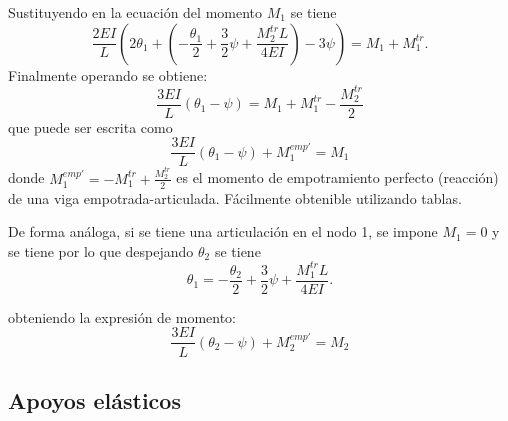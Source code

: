 Sustituyendo en la ecuación del momento $M_1$ se tiene
%
\begin{equation}
\frac{2 EI}{L} \left( 2 \theta_1 + \left( -\frac{\theta_1}{2} + \frac{3}{2} \psi + \frac{M_2^{tr} L }{4 EI} \right) - 3 \psi  \right) = M_1 + M_1^{tr}.
\end{equation}
%
Finalmente operando se obtiene:
%
\begin{equation} \label{eqn:ecmomart}
\frac{3 EI}{L} \left( \theta_1 - \psi  \right) = M_1 + M_1^{tr} - \frac{ M_2^{tr}}{2}
\end{equation}
%
que puede ser escrita como
%
\begin{equation}
\boxed{
\frac{3 EI}{L} \left( \theta_1 - \psi  \right) + M_1^{emp'} = M_1
}
\end{equation}
%
donde $M_1^{emp'} = - M_1^{tr} + \frac{ M_2^{tr}}{2} $ es el momento de empotramiento perfecto (reacción) de una viga empotrada-articulada. %
%
Fácilmente obtenible utilizando tablas.


De forma análoga, si se tiene una articulación en el nodo 1, se impone $M_1=0$ y se tiene
por lo que despejando $\theta_{2}$ se tiene
%
\begin{equation} \label{eqn:artictheta1}
\theta_1 = -\frac{\theta_2}{2} + \frac{3}{2} \psi + \frac{M_1^{tr} L }{4 EI}.
\end{equation}

obteniendo la expresión de momento:%
\begin{equation}
\boxed{
	\frac{3 EI}{L} \left( \theta_2 - \psi  \right) + M_2^{emp'} = M_2
}
\end{equation}


%
%
%
%

\subsection{Apoyos elásticos}

